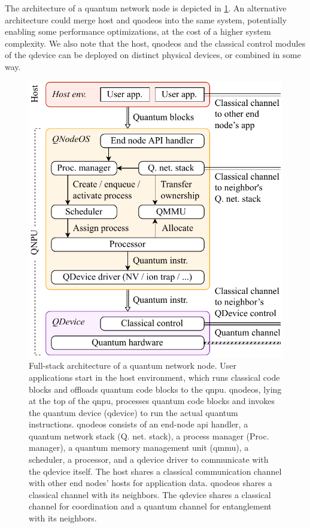 The architecture of a quantum network node is depicted in \cref{fig:quantum-node}. An alternative
architecture could merge host and \acrshort{qnodeos} into the same system, potentially enabling some
performance optimizations, at the cost of a higher system complexity. We also note that the host,
\acrshort{qnodeos} and the classical control modules of the \acrshort{qdevice} can be deployed on
distinct physical devices, or combined in some way.

\begin{figure}[t]
    \centering
    \includegraphics[width=0.6\linewidth]{figures/quantum-node.pdf}
    \caption{
        Full-stack architecture of a quantum network node. User applications start in the host
        environment, which runs classical code blocks and offloads quantum code blocks to the
        \acrshort{qnpu}. \acrshort{qnodeos}, lying at the top of the \acrshort{qnpu}, processes
        quantum code blocks and invokes the quantum device (\acrshort{qdevice}) to run the actual
        quantum instructions. \acrshort{qnodeos} consists of an end-node \acrshort{api} handler, a
        quantum network stack (Q. net. stack), a process manager (Proc. manager), a quantum memory
        management unit (\acrshort{qmmu}), a scheduler, a processor, and a \acrshort{qdevice} driver
        to communicate with the \acrshort{qdevice} itself. The host shares a classical communication
        channel with other end nodes' hosts for application data. \acrshort{qnodeos} shares a
        classical channel with its neighbors. The \acrshort{qdevice} shares a classical channel for
        coordination and a quantum channel for entanglement with its neighbors.
    }
    \label{fig:quantum-node}
\end{figure}

